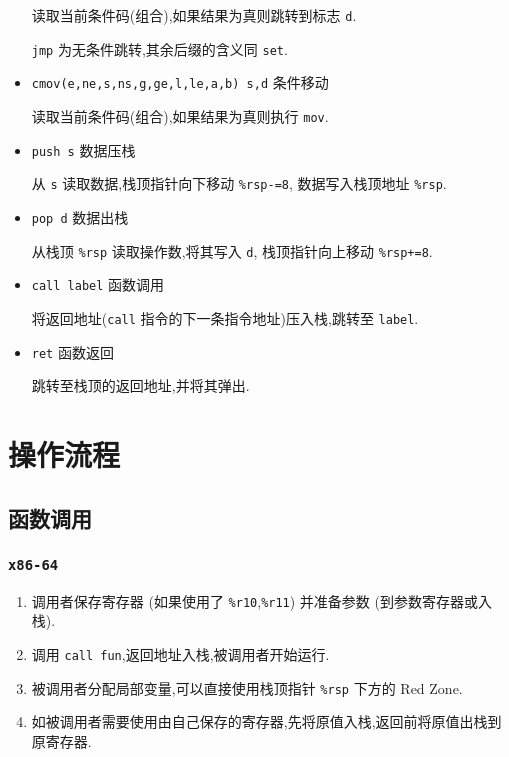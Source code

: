 \begin{itemize}
                读取当前条件码(组合),如果结果为真则跳转到标志 \texttt{d}.
                
                \texttt{jmp} 为无条件跳转,其余后缀的含义同 \texttt{set}.
            \item \texttt{cmov(e,ne,s,ns,g,ge,l,le,a,b)   s,d} 条件移动

                读取当前条件码(组合),如果结果为真则执行 \texttt{mov}.
            \item \texttt{push  s} 数据压栈

                从 \texttt{s} 读取数据,栈顶指针向下移动 \texttt{\%rsp-=8}, 数据写入栈顶地址 \texttt{\%rsp}.
            \item \texttt{pop   d} 数据出栈

                从栈顶 \texttt{\%rsp} 读取操作数,将其写入 \texttt{d}, 栈顶指针向上移动 \texttt{\%rsp+=8}.
            \item \texttt{call  label} 函数调用

                将返回地址(\texttt{call} 指令的下一条指令地址)压入栈,跳转至 \texttt{label}.
            \item \texttt{ret} 函数返回

                跳转至栈顶的返回地址,并将其弹出.
        \end{itemize}
    \section{操作流程}
        \subsection{函数调用}
            \subsubsection{\texttt{x86-64}}
                \begin{enumerate}
                    \item 调用者保存寄存器 (如果使用了 \texttt{\%r10},\texttt{\%r11}) 并准备参数 (到参数寄存器或入栈).
                    \item 调用 \texttt{call fun},返回地址入栈,被调用者开始运行.
                    \item 被调用者分配局部变量,可以直接使用栈顶指针 \texttt{\%rsp} 下方的 Red Zone.
                    \item 如被调用者需要使用由自己保存的寄存器,先将原值入栈,返回前将原值出栈到原寄存器.
                \end{enumerate}
